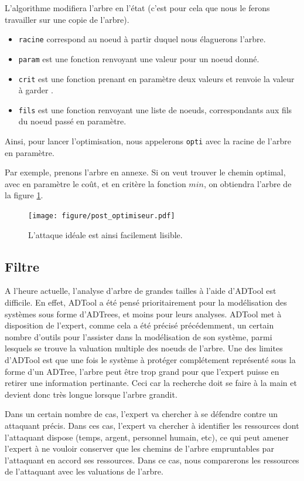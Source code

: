 		L'algorithme modifiera l'arbre en l'état (c'est pour cela que nous le ferons travailler sur une copie de l'arbre).
		\begin{itemize}
			\item \verb|racine| correspond au noeud à partir duquel nous élaguerons l'arbre.
			\item \verb|param| est une fonction renvoyant une valeur pour un noeud donné.
			\item \verb|crit| est une fonction prenant en paramètre deux valeurs et renvoie la valeur à \og garder \fg.
			\item \verb|fils| est une fonction renvoyant une liste de noeuds, correspondants aux fils du noeud passé en paramètre.
		\end{itemize}
		Ainsi, pour lancer l'optimisation, nous appelerons \verb|opti| avec la racine de l'arbre en paramètre.

		Par exemple, prenons l'arbre en annexe.
		Si on veut trouver le chemin optimal, avec en paramètre le coût, et en critère la fonction $min$, on obtiendra l'arbre de la figure \ref{fig:arbre_post_opti}.

		\begin{figure}
			\centering
			\texttt{[image: figure/post\_optimiseur.pdf]}
			\caption{L'attaque idéale est ainsi facilement lisible.}
			\label{fig:arbre_post_opti}
		\end{figure}


	\subsection{Filtre}

		A l'heure actuelle, l'analyse d'arbre de grandes tailles à l'aide d'ADTool est difficile. 
		En effet, ADTool a été pensé prioritairement pour la modélisation des systèmes sous forme d'ADTrees, et moins pour leurs analyses. 
		ADTool met à disposition de l'expert, comme cela a été précisé précédemment, un certain nombre d'outils pour l'assister dans la modélisation de son système, parmi lesquels se trouve la valuation multiple des noeuds de l'arbre. 
		Une des limites d'ADTool est que une fois le système à protéger complétement représenté sous la forme d'un ADTree, l'arbre peut être trop grand pour que l'expert puisse en retirer une information pertinante. Ceci car la recherche doit se faire à la main et devient donc très longue lorsque l'arbre grandit. 

		Dans un certain nombre de cas, l'expert va chercher à se défendre contre un attaquant précis. Dans ces cas, l'expert va chercher à identifier les ressources dont l'attaquant dispose (temps, argent, personnel humain, etc), ce qui peut amener l'expert à ne vouloir conserver que les chemins de l'arbre empruntables par 				l'attaquant en accord ses ressources. Dans ce cas, nous comparerons les ressources de l'attaquant avec les valuations de l'arbre.

